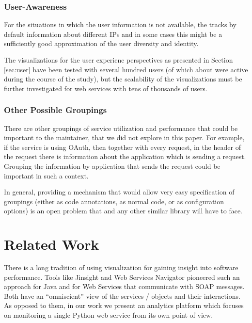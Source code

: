 \documentclass[conference]{IEEEtran}
\begin{document}
  \subsubsection{User-Awareness }

    For the situations in which the user information is not available, the \tool tracks by default information about different IPs and in some cases this might be a sufficiently good approximation of the user diversity and identity. 

    The visualizations for the user experiene perspectives as presented in Section \ref{sec:user} have been tested with several hundred users (of which about \activeUserCount were active during the course of the study), but the scalability of the visualizations must be further investigated for web services with tens of thousands of users.


  \subsubsection{Other Possible Groupings}

    There are other groupings of service utilization and performance that could be important to the maintainer, that we did not explore in this paper. For example, if the service is using OAuth, then together with every request, in the header of the request there is information about the application which is sending a request. Grouping the information by application that sends the request could be important in such a context. 

    In general, providing a mechanism that would allow very easy specification of groupings (either as code annotations, as normal code, or as configuration options) is an open problem that \tool and any other similar library will have to face.



\section{Related Work}
\label{sec:related}


There is a long tradition of using visualization for gaining insight into software performance. Tools like Jinsight \cite{Pauw02a} and Web Services Navigator \cite{Pauw05} pioneered such an approach for Java and for Web Services that communicate with SOAP messages. Both have an ``omniscient'' view of the services / objects and their interactions. As opposed to them, in our work we present an analytics platform which focuses on monitoring a single Python web service from its own point of view.
\end{document}
